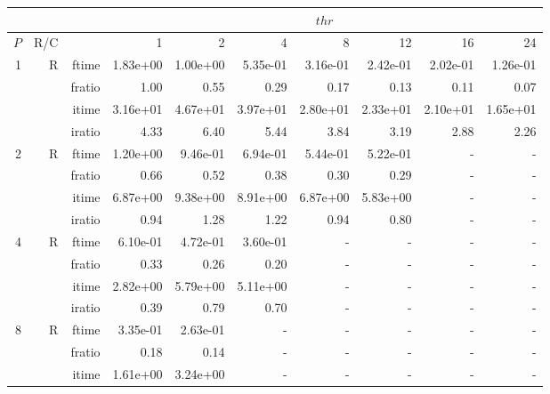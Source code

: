 \documentclass[a4paper]{article}
\begin{document}
\begin{table}[htbp]
\begin{center}
\begin{small}
\begin{tabular}{|r|r|r|r|r|r|r|r|r|r|}
\hline 
     & & & \multicolumn{7}{c|}{$thr$} \\ \hline
    $P$ & R/C &  & 1           & 2    & 4    & 8    & 12   & 16    & 24  \\ \hline\hline
     1 & R & ftime & 1.83e+00 & 1.00e+00 & 5.35e-01 & 3.16e-01 & 2.42e-01 & 2.02e-01 & 1.26e-01 \\   
          &      & fratio & 1.00 & 0.55 & 0.29 & 0.17 & 0.13 & 0.11 & 0.07 \\   
          &      & itime & 3.16e+01 & 4.67e+01 & 3.97e+01 & 2.80e+01 & 2.33e+01 & 2.10e+01 & 1.65e+01 \\   
          &      & iratio & 4.33 & 6.40 & 5.44 & 3.84 & 3.19 & 2.88 & 2.26 \\ \hline 
     2 & R & ftime & 1.20e+00 & 9.46e-01 & 6.94e-01 & 5.44e-01 & 5.22e-01 &     -     &     -     \\   
          &      & fratio & 0.66 & 0.52 & 0.38 & 0.30 & 0.29 &     -     &     -     \\   
          &      & itime & 6.87e+00 & 9.38e+00 & 8.91e+00 & 6.87e+00 & 5.83e+00 &     -     &     -     \\   
          &      & iratio & 0.94 & 1.28 & 1.22 & 0.94 & 0.80 &     -     &     -     \\ \hline 
     4 & R & ftime & 6.10e-01 & 4.72e-01 & 3.60e-01 &     -     &     -     &     -     &     -     \\   
          &      & fratio & 0.33 & 0.26 & 0.20 &     -     &     -     &     -     &     -     \\   
          &      & itime & 2.82e+00 & 5.79e+00 & 5.11e+00 &     -     &     -     &     -     &     -     \\   
          &      & iratio & 0.39 & 0.79 & 0.70 &     -     &     -     &     -     &     -     \\ \hline 
     8 & R & ftime & 3.35e-01 & 2.63e-01 &     -     &     -     &     -     &     -     &     -     \\   
          &      & fratio & 0.18 & 0.14 &     -     &     -     &     -     &     -     &     -     \\   
          &      & itime & 1.61e+00 & 3.24e+00 &     -     &     -     &     -     &     -     &     -     \\   

\end{tabular}
\end{small}
\end{center}
\end{table}
\end{document}
